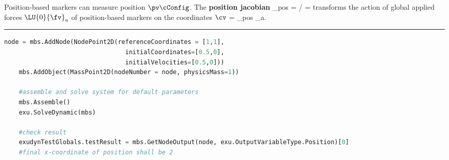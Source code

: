     Position-based markers can measure position $\pv\cConfig$. The {\bf position jacobian}  
    \be
      \Jm_{pos} = \partial \pv\cCur / \partial \cv\cCur = 
    \ee
    transforms the action of global applied forces $\LU{0}{\fv}_a$ of position-based markers on the coordinates $\cv$
    \be
      \Qm = \Jm_{pos} _a.
    \ee
\vspace{6pt}\par\noindent\rule{\textwidth}{0.4pt}
\label{miniExample_ObjectMassPoint2D}
\pythonstyle
\begin{lstlisting}[language=Python, firstnumber=1]
    node = mbs.AddNode(NodePoint2D(referenceCoordinates = [1,1], 
                                 initialCoordinates=[0.5,0],
                                 initialVelocities=[0.5,0]))
    mbs.AddObject(MassPoint2D(nodeNumber = node, physicsMass=1))

    #assemble and solve system for default parameters
    mbs.Assemble()
    exu.SolveDynamic(mbs)

    #check result
    exudynTestGlobals.testResult = mbs.GetNodeOutput(node, exu.OutputVariableType.Position)[0]
    #final x-coordinate of position shall be 2
\end{lstlisting}

